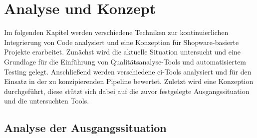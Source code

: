 
\section{Analyse und Konzept} \label{sec:03-concept}

Im folgenden Kapitel werden verschiedene Techniken zur kontinuierlichen Integrierung von Code analysiert und eine
Konzeption für Shopware-basierte Projekte erarbeitet.
Zunächst wird die aktuelle Situation untersucht und eine Grundlage für die Einführung von Qualitätsanalyse-Tools und
automatisiertem Testing gelegt.
Anschließend werden verschiedene \acrshort{ci}-Tools analysiert und für den Einsatz in der zu konzipierenden Pipeline
bewertet.
Zuletzt wird eine Konzeption durchgeführt, diese stützt sich dabei auf die zuvor festgelegte Ausgangssituation und die
untersuchten Tools.

\subsection{Analyse der Ausgangssituation} \label{subsec:03-concept-1}


